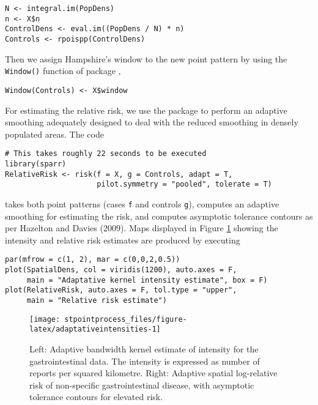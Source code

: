 \begin{verbatim}
N <- integral.im(PopDens) 
n <- X$n
ControlDens <- eval.im((PopDens / N) * n)
Controls <- rpoispp(ControlDens)
\end{verbatim}

Then we assign Hampshire's window to the new point pattern by using the \texttt{Window()} function of package ,

\begin{verbatim}
Window(Controls) <- X$window
\end{verbatim}

For estimating the relative risk, we use the  package to perform an adaptive smoothing adequately designed to deal with the reduced smoothing in densely populated areas. The code

\begin{verbatim}
# This takes roughly 22 seconds to be executed 
library(sparr)
RelativeRisk <- risk(f = X, g = Controls, adapt = T, 
                     pilot.symmetry = "pooled", tolerate = T)
\end{verbatim}

takes both point patterns (cases \texttt{f} and controls \texttt{g}), computes an adaptive smoothing for estimating the risk, and computes asymptotic tolerance contours as per Hazelton and Davies (2009). Maps displayed in Figure \ref{fig:adaptativeintensities} showing the intensity and relative risk estimates are produced by executing

\begin{verbatim}
par(mfrow = c(1, 2), mar = c(0,0,2,0.5)) 
plot(SpatialDens, col = viridis(1200), auto.axes = F,
     main = "Adaptative kernel intensity estimate", box = F)
plot(RelativeRisk, auto.axes = F, tol.type = "upper", 
     main = "Relative risk estimate")
\end{verbatim}

\begin{figure}

{\centering \texttt{[image: stpointprocess\_files/figure-latex/adaptativeintensities-1]} 

}

\caption{Left: Adaptive bandwidth kernel estimate of intensity for the gastrointestinal data. The intensity is expressed as number of reports per squared kilometre. Right: Adaptive spatial log-relative risk of non-specific gastrointestinal disease, with asymptotic tolerance contours for elevated risk.}\label{fig:adaptativeintensities}
\end{figure}

